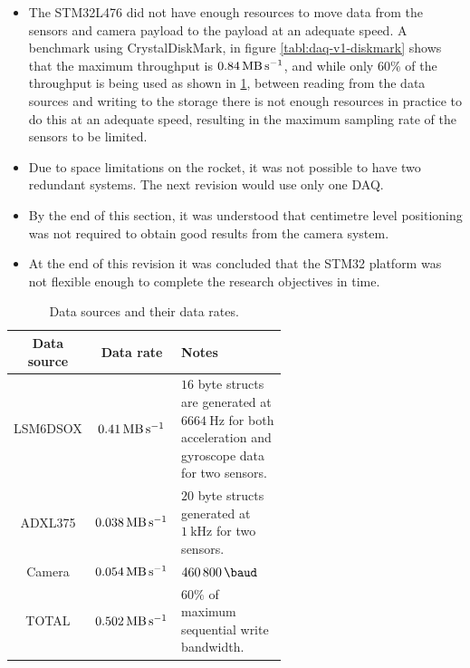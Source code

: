 \documentclass{report}
\begin{document}
\begin{itemize}
  \item The STM32L476 did not have enough resources to move data from the sensors and camera payload to the payload at an adequate speed. A benchmark using CrystalDiskMark, in figure \ref{tabl:daq-v1-diskmark} shows that the maximum throughput is $\SI{0.84}{\mega\byte\per\second}$, and while only 60\% of the throughput is being used as shown in \ref{tabl:daq-v1-sensor-datarate}, between reading from the data sources and writing to the storage there is not enough resources in practice to do this at an adequate speed, resulting in the maximum sampling rate of the sensors to be limited.
  \item Due to space limitations on the rocket, it was not possible to have two redundant systems. The next revision would use only one DAQ.
  \item By the end of this section, it was understood that centimetre level positioning was not required to obtain good results from the camera system.
  \item At the end of this revision it was concluded that the STM32 platform was not flexible enough to complete the research objectives in time.
\end{itemize}

\begin{table}[H]
  \centering
  \begin{tabular}{|c|c|p{0.6\linewidth}|}
    Data source & Data rate                           & Notes                                                                                                            \\
    \hline
    LSM6DSOX    & $\SI{0.41}{\mega\byte\per\second}$  & $16$ byte structs are generated at $\SI{6664}{\hertz}$ for both acceleration and gyroscope data for two sensors. \\
    ADXL375     & $\SI{0.038}{\mega\byte\per\second}$ & $20$ byte structs generated at $\SI{1}{\kilo\hertz}$ for two sensors.                                            \\
    Camera      & $\SI{0.054}{\mega\byte\per\second}$ & $\SI{460800}{\baud}$                                                                                             \\
    TOTAL       & $\SI{0.502}{\mega\byte\per\second}$ & $60\%$ of maximum sequential write bandwidth.
  \end{tabular}
  \caption{Data sources and their data rates.}
  \label{tabl:daq-v1-sensor-datarate}
\end{table}
\end{document}

